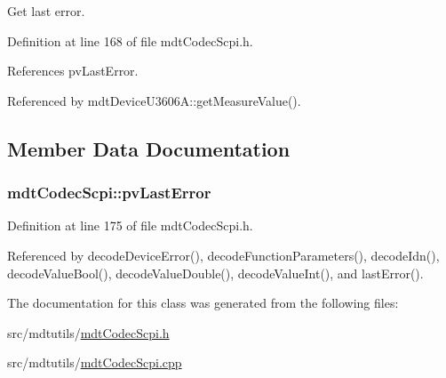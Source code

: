 Get last error. 



Definition at line 168 of file mdt\-Codec\-Scpi.\-h.



References pv\-Last\-Error.



Referenced by mdt\-Device\-U3606\-A\-::get\-Measure\-Value().



\subsection{Member Data Documentation}
\hypertarget{classmdt_codec_scpi_ac08e83ff5a33b4b61fe4b173fc6753c8}{
\subsubsection[{pv\-Last\-Error}]{ mdt\-Codec\-Scpi\-::pv\-Last\-Error\hspace{0.3cm}{\ttfamily [protected]}}}\label{classmdt_codec_scpi_ac08e83ff5a33b4b61fe4b173fc6753c8}


Definition at line 175 of file mdt\-Codec\-Scpi.\-h.



Referenced by decode\-Device\-Error(), decode\-Function\-Parameters(), decode\-Idn(), decode\-Value\-Bool(), decode\-Value\-Double(), decode\-Value\-Int(), and last\-Error().



The documentation for this class was generated from the following files\-:\begin{DoxyCompactItemize}
\item 
src/mdtutils/\hyperlink{mdt_codec_scpi_8h}{mdt\-Codec\-Scpi.\-h}\item 
src/mdtutils/\hyperlink{mdt_codec_scpi_8cpp}{mdt\-Codec\-Scpi.\-cpp}\end{DoxyCompactItemize}

